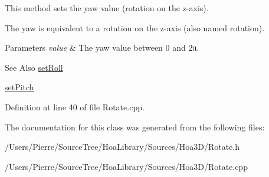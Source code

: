 This method sets the yaw value (rotation on the z-\/axis). 

The yaw is equivalent to a rotation on the z-\/axis (also named rotation).


\begin{DoxyParams}{Parameters}
{\em value} & The yaw value between 0 and 2π. \\
\hline
\end{DoxyParams}
\begin{DoxySeeAlso}{See Also}
\hyperlink{class_hoa3_d_1_1_rotate_a89599a9cd8c10240ce71b8fd7bdbb3b7}{set\-Roll} 

\hyperlink{class_hoa3_d_1_1_rotate_aeb7e844c29c2f9bb9cc7de3ef89385f6}{set\-Pitch} 
\end{DoxySeeAlso}


Definition at line 40 of file Rotate.\-cpp.



The documentation for this class was generated from the following files\-:\begin{DoxyCompactItemize}
\item 
/\-Users/\-Pierre/\-Source\-Tree/\-Hoa\-Library/\-Sources/\-Hoa3\-D/Rotate.\-h\item 
/\-Users/\-Pierre/\-Source\-Tree/\-Hoa\-Library/\-Sources/\-Hoa3\-D/Rotate.\-cpp\end{DoxyCompactItemize}
